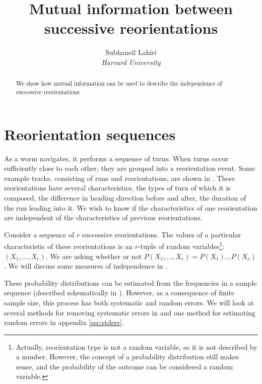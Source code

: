 \documentclass[12pt]{article}
\title{Mutual information between successive reorientations}
\author{Subhaneil Lahiri
\\
%
%
\small{\emph{Harvard University}}
%
}
\begin{document}
\maketitle





\begin{abstract}
  We show how mutual information can be used to describe the independence of successive reorientations
\end{abstract}

\tableofcontents
\listoffigures
\listoftables


\section{Reorientation sequences}\label{sec:reoseq}

As a worm navigates, it performs a sequence of turns. When turns occur sufficiently close to each other, they are grouped into a reorientation event. Some example tracks, consisting of runs and reorientations, are shown in . These reorientations have several characteristics, \eg the types of turn of which it is composed, the difference in heading direction before and after, the duration of the run leading into it. We wish to know if the characteristics of one reorientation are independent of the characteristics of previous reorientations.

Consider a sequence of $r$ successive reorientations. The values of a particular characteristic of these reorientations is an $r$-tuple of random variables\footnote{ Actually, reorientation type is not a random variable, as it is not described by a number. However, the concept of a probability distribution still makes sense, and the probability of the outcome can be considered a random variable. }: $(X_1,\ldots,X_r)$. We are asking whether or not $P(X_1,\ldots,X_r) = P(X_1)\ldots P(X_r)$. We will discuss some measures of independence in .

These probability distributions can be estimated from the frequencies in a sample sequence (described schematically in ). However, as a consequence of finite sample size, this process has both systematic and random errors. We will look at several methods for removing systematic errors in  and one method for estimating random errors in appendix \ref{sec:stderr}.
\end{document}
